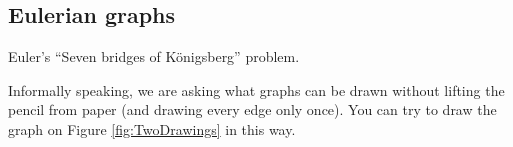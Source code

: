 \subsection{Eulerian graphs}
Euler's ``Seven bridges of K\"onigsberg'' problem.

Informally speaking, we are asking what graphs can be drawn without lifting the pencil from paper
(and drawing every edge only once).
You can try to draw the graph on Figure \ref{fig:TwoDrawings} in this way.
